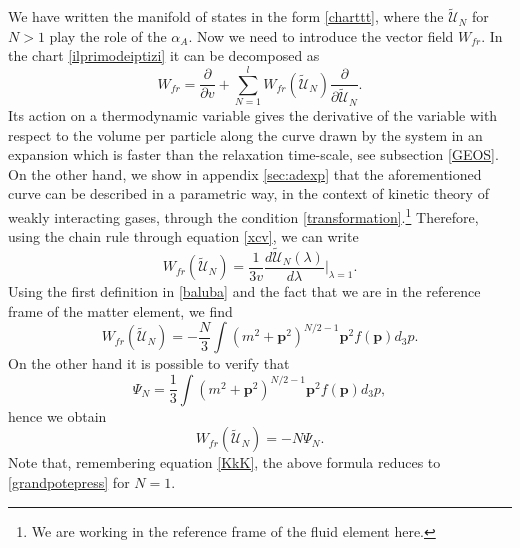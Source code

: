 \documentclass[useAMS,usenatbib,prd,twocolumn,nofootinbib]{revtex4-1}
\newcommand{\vect}[1]{\mathbf{{#1}}}
\begin{document}
We have written the manifold of states in the form \eqref{charttt}, where the $\tilde{\mathcal{U}}_N$ for $N>1$ play the role of the $\alpha_A$. Now we need to introduce the vector field $W_{fr}$. In the chart \eqref{ilprimodeiptizi} it can be decomposed as
\begin{equation}\label{expanDo}
W_{fr} = \dfrac{\partial}{\partial v} + \sum_{N=1}^l W_{fr}(\tilde{\mathcal{U}}_N) \dfrac{\partial}{\partial \tilde{\mathcal{U}}_N}.
\end{equation}
Its action on a thermodynamic variable gives the derivative of the variable with respect to the volume per particle along the curve drawn by the system in an expansion which is faster than the relaxation time-scale, see subsection \ref{GEOS}. On the other hand, we show in appendix \ref{sec:adexp} that the aforementioned curve can be described in a parametric way, in the context of kinetic theory of weakly interacting gases, through the condition \eqref{transformation}.\footnote{
    We are working in the reference frame of the fluid element here.
} Therefore, using the chain rule through equation \eqref{xcv}, we can write
\begin{equation}
W_{fr}(\tilde{\mathcal{U}}_N) = \dfrac{1}{3v} \dfrac{d\tilde{\mathcal{U}}_N(\lambda)}{d\lambda} \bigg|_{\lambda=1}.
\end{equation} 
Using the first definition in \eqref{baluba} and the fact that we are in the reference frame of the matter element, we find
\begin{equation}
W_{fr}(\tilde{\mathcal{U}}_N) = -\dfrac{N}{3}  \int (m^2 + \vect{p}^2)^{N/2-1} \vect{p}^2 f(\vect{p}) d_3 p.
\end{equation} 
On the other hand it is possible to verify that
\begin{equation}
\Psi_N = \dfrac{1}{3}  \int (m^2 + \vect{p}^2)^{N/2-1} \vect{p}^2 f(\vect{p}) d_3 p,
\end{equation}
hence we obtain
\begin{equation}\label{hHHHHHHHh}
W_{fr}(\tilde{\mathcal{U}}_N) = -N \Psi_N.
\end{equation}
Note that, remembering equation \eqref{KkK}, the above formula reduces to \eqref{grandpotepress} for $N=1$.
\end{document}
